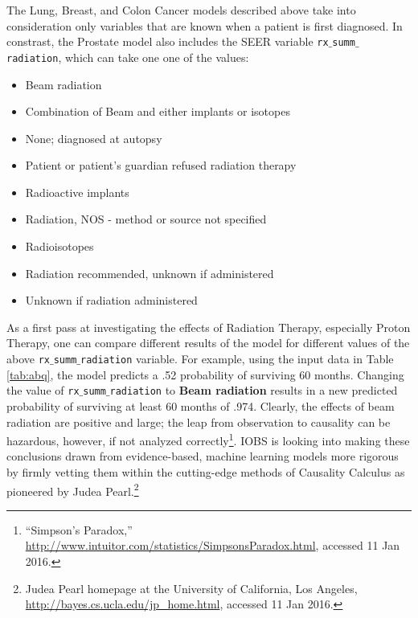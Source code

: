 \documentclass[a4paper,11pt]{article}
\newcommand{\codewhite}[1]{\colorbox{white}{\texttt{#1}}}
\begin{document}
The Lung, Breast, and Colon Cancer models described above take into consideration only variables that are known when a patient is first diagnosed. In constrast, the Prostate model also includes the SEER variable \codewhite{rx$\_$summ$\_$radiation}, which can take one one of the values:

\begin{itemize}[noitemsep]
\item Beam radiation
\item Combination of Beam and either implants or isotopes
\item None; diagnosed at autopsy
\item Patient or patient's guardian refused radiation therapy
\item Radioactive implants
\item Radiation, NOS - method or source not specified
\item Radioisotopes
\item Radiation recommended, unknown if administered
\item Unknown if radiation administered
\end{itemize}

As a first pass at investigating the effects of Radiation Therapy, especially Proton Therapy, one can compare different results of the model for different values of the above \codewhite{rx$\_$summ$\_$radiation} variable. For example, using the input data in Table \ref{tab:abq}, the model predicts a .52 probability of surviving 60 months. Changing the value of \codewhite{rx$\_$summ$\_$radiation} to \textbf{Beam radiation} results in a new predicted probability of surviving at least 60 months of .974.
Clearly, the effects of beam radiation are positive and large; the leap from observation to causality can be hazardous, however, if not analyzed correctly\footnote{``Simpson's Paradox,'' \url{http://www.intuitor.com/statistics/SimpsonsParadox.html}, accessed 11 Jan 2016.}. IOBS is looking into making these conclusions drawn from evidence-based, machine learning models more rigorous by firmly vetting them within the cutting-edge methods of Causality Calculus as pioneered by Judea Pearl.\footnote{Judea Pearl homepage at the University of California, Los Angeles, \url{http://bayes.cs.ucla.edu/jp_home.html}, accessed 11 Jan 2016.}
\end{document}
